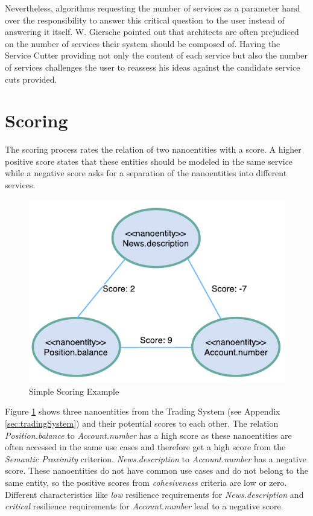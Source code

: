 Nevertheless, algorithms requesting the number of services as a parameter hand over the responsibility to answer this critical question to the user instead of answering it itself. W. Giersche pointed out that architects are often prejudiced on the number of services their system should be composed of. Having the Service Cutter providing not only the content of each service but also the number of services challenges the user to reassess his ideas against the candidate service cuts provided. 


\section{Scoring}

The scoring process rates the relation of two nanoentities with a score. A higher positive score states that these entities should be modeled in the same service while a negative score asks for a separation of the nanoentities into different services.

\begin{figure}[H]
	\begin{center}
		\includegraphics[scale=1]{diagrams/scoring_example.pdf}
		\caption{Simple Scoring Example}
		\label{fig:scoringExample}
	\end{center}
\end{figure}

Figure \ref{fig:scoringExample} shows three nanoentities from the Trading System (see Appendix \ref{sec:tradingSystem}) and their potential scores to each other. The relation \textit{Position.balance} to \textit{Account.number} has a high score as these nanoentities are often accessed in the same use cases and therefore get a high score from the \textit{Semantic Proximity} criterion. \textit{News.description} to \textit{Account.number} has a negative score. These nanoentities do not have common use cases and do not belong to the same entity, so the positive scores from \textit{cohesiveness} criteria are low or zero. Different characteristics like \textit{low} resilience requirements for \textit{News.description} and \textit{critical} resilience requirements for \textit{Account.number} lead to a negative score. 


